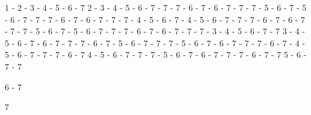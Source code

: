 1 - 2 - 3 - 4 - 5 - 6 - 7           2 - 3 - 4 - 5 - 6 - 7
                  - 7                             - 7
              - 6 - 7                         - 6 - 7
              - 7                             - 7
          - 5 - 6 - 7                     - 5 - 6 - 7
              - 7                             - 7
          - 6 - 7                         - 6 - 7
          - 7                             - 7
      - 4 - 5 - 6 - 7                 - 4 - 5 - 6 - 7
              - 7                             - 7
          - 6 - 7                         - 6 - 7
          - 7                             - 7
      - 5 - 6 - 7                     - 5 - 6 - 7
          - 7                             - 7
      - 6 - 7                         - 6 - 7
      - 7                             - 7
  - 3 - 4 - 5 - 6 - 7
              - 7                   3 - 4 - 5 - 6 - 7
          - 6 - 7                             - 7
          - 7                             - 6 - 7
      - 5 - 6 - 7                         - 7
          - 7                         - 5 - 6 - 7
      - 6 - 7                             - 7
      - 7                             - 6 - 7
  - 4 - 5 - 6 - 7                     - 7
          - 7
      - 6 - 7                       4 - 5 - 6 - 7
      - 7                                 - 7
  - 5 - 6 - 7                         - 6 - 7
      - 7                             - 7
  - 6 - 7
  - 7                               5 - 6 - 7
                                      - 7

                                    6 - 7

                                    7

